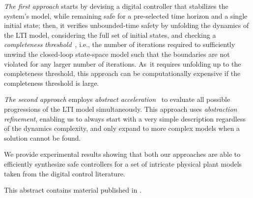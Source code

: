 \documentclass[submission]{eptcs}
\begin{document}
\emph{The first approach} starts by devising a
digital controller that stabilizes the system's model, while remaining safe for a
pre-selected time horizon and a single initial state; then, it verifies
unbounded-time safety by unfolding the dynamics of the LTI model, considering the
full set of initial states, and checking a \emph{completeness
threshold}~\cite{DBLP:conf/vmcai/KroeningS03}, i.e., the number of
iterations required to sufficiently unwind the closed-loop state-space
model such that the boundaries are not violated for any larger number of
iterations.  As~it requires unfolding up to the completeness threshold, this
approach can be computationally expensive if the completeness threshold is large.

\emph{The second approach}
employs \emph{abstract acceleration}~\cite{cattaruzza2015unbounded} to
evaluate all possible progressions of the LTI model simultaneously. 
This approach uses \emph{abstraction refinement},
enabling us to always start with a very simple description regardless of the
dynamics complexity, and only expand to more complex models
when a solution cannot be found.

We provide experimental results showing that both our approaches are able to
efficiently synthesize safe controllers for a set of intricate physical
plant models taken from the digital control literature.

This abstract contains material published in \cite{DBLP:conf/cav/AbateBCCDKKP17}.

       
  
\end{document}
